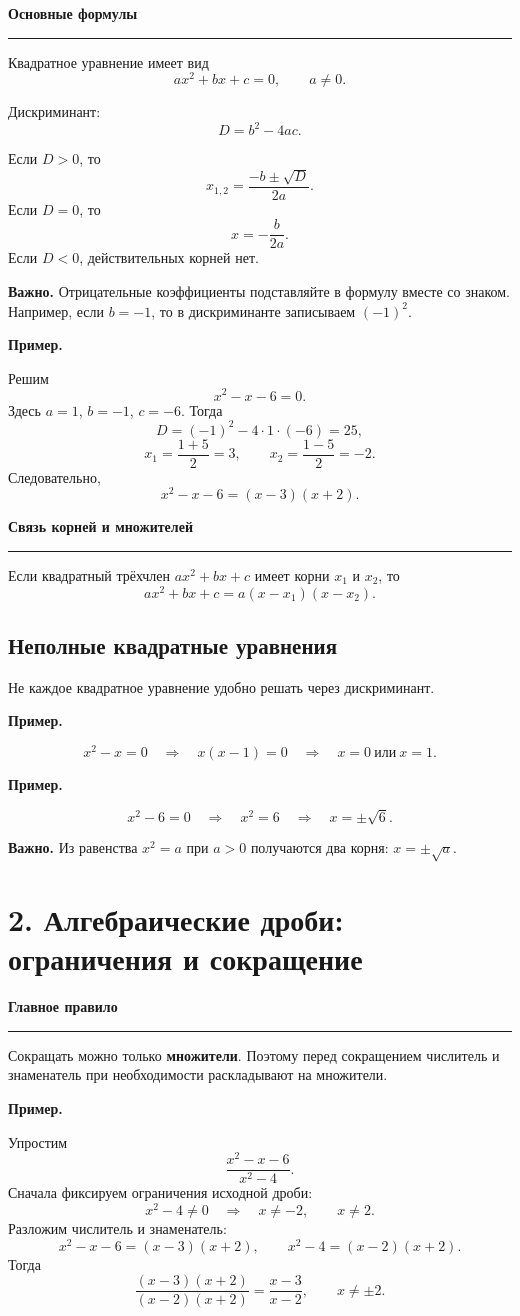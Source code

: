 \documentclass[a4paper,12pt]{article}
\newcommand{\keyidea}[1]{%
  \par\medskip
  {\bfseries\color{darkaccent}#1}\par
  \vspace{1pt}
  {\color{accent}\rule{\linewidth}{0.55pt}}\par
  \vspace{2pt}
}
\newcommand{\important}[1]{%
  \par\smallskip
  \noindent\textbf{\color{darkaccent}Важно.} #1\par
}
\newcommand{\exampletitle}{%
  \par\smallskip
  \noindent\textbf{\color{accent}Пример.}\enspace
}
\begin{document}
\keyidea{Основные формулы}
Квадратное уравнение имеет вид
\[
ax^2+bx+c=0,\qquad a\ne0.
\]

Дискриминант:
\[
D=b^2-4ac.
\]

Если \(D>0\), то
\[
x_{1,2}=\frac{-b\pm\sqrt D}{2a}.
\]
Если \(D=0\), то
\[
x=-\frac{b}{2a}.
\]
Если \(D<0\), действительных корней нет.

\important{Отрицательные коэффициенты подставляйте в формулу вместе со знаком. Например, если \(b=-1\), то в дискриминанте записываем \((-1)^2\).}

\exampletitle
Решим
\[
x^2-x-6=0.
\]
Здесь \(a=1\), \(b=-1\), \(c=-6\). Тогда
\[
D=(-1)^2-4\cdot1\cdot(-6)=25,
\]
\[
x_1=\frac{1+5}{2}=3,
\qquad
x_2=\frac{1-5}{2}=-2.
\]
Следовательно,
\[
x^2-x-6=(x-3)(x+2).
\]

\keyidea{Связь корней и множителей}
Если квадратный трёхчлен \(ax^2+bx+c\) имеет корни \(x_1\) и \(x_2\), то
\[
ax^2+bx+c=a(x-x_1)(x-x_2).
\]

\subsection{Неполные квадратные уравнения}
Не каждое квадратное уравнение удобно решать через дискриминант.

\exampletitle
\[
x^2-x=0
\quad\Longrightarrow\quad
x(x-1)=0
\quad\Longrightarrow\quad
x=0\ \text{или}\ x=1.
\]

\exampletitle
\[
x^2-6=0
\quad\Longrightarrow\quad
x^2=6
\quad\Longrightarrow\quad
x=\pm\sqrt6.
\]

\important{Из равенства \(x^2=a\) при \(a>0\) получаются два корня: \(x=\pm\sqrt a\).}

\section{2. Алгебраические дроби: ограничения и сокращение}

\keyidea{Главное правило}
Сокращать можно только \textbf{множители}. Поэтому перед сокращением числитель и знаменатель при необходимости раскладывают на множители.

\exampletitle
Упростим
\[
\frac{x^2-x-6}{x^2-4}.
\]
Сначала фиксируем ограничения исходной дроби:
\[
x^2-4\ne0
\quad\Longrightarrow\quad
x\ne-2,\qquad x\ne2.
\]
Разложим числитель и знаменатель:
\[
x^2-x-6=(x-3)(x+2),
\qquad
x^2-4=(x-2)(x+2).
\]
Тогда
\[
\frac{(x-3)(x+2)}{(x-2)(x+2)}
=
\frac{x-3}{x-2},
\qquad x\ne\pm2.
\]
\end{document}
